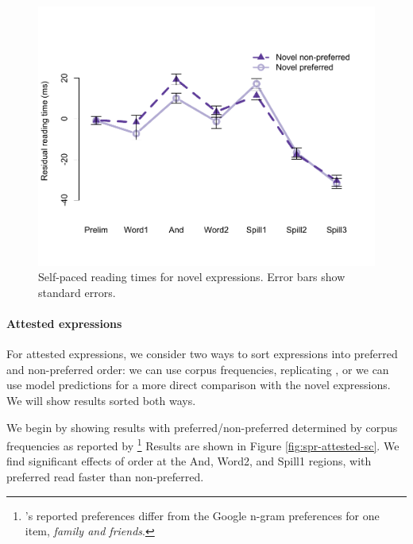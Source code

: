 \documentclass[authoryear]{elsarticle}
\begin{document}
\begin{figure}[t]
\includegraphics[scale=0.8]{spr-novel.pdf}
\caption{Self-paced reading times for novel expressions. Error bars show standard errors.} \label{fig:spr-novel}
\end{figure}

\paragraph{Attested expressions}
For attested expressions, we consider two ways to sort expressions into preferred and non-preferred order: we can use corpus frequencies, replicating \citet{SiyanovaChanturia:2011ep}, or we can use model predictions for a more direct comparison with the novel expressions. We will show results sorted both ways.

We begin by showing results with preferred/non-preferred determined by corpus frequencies as reported by \citeauthor{SiyanovaChanturia:2011ep}\footnote{\citeauthor{SiyanovaChanturia:2011ep}'s reported preferences differ from the Google n-gram preferences for one item, \emph{family and friends}.}  Results are shown in Figure \ref{fig:spr-attested-sc}. We find significant effects of order at the And, Word2, and Spill1 regions, with preferred read faster than non-preferred.
\end{document}
